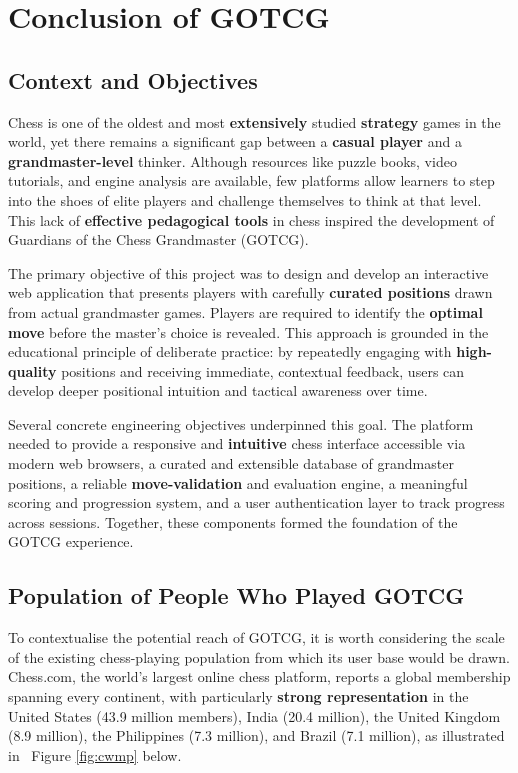 \chapter{Conclusion of GOTCG}
\label{cha:conclusion}

\section{Context and Objectives}

Chess is one of the oldest and most \textbf{extensively} studied \textbf{strategy} games in the world, yet there remains a significant gap between a \textbf{casual player} and a \textbf{grandmaster-level} thinker. Although resources like puzzle books, video tutorials, and engine analysis are available, few platforms allow learners to step into the shoes of elite players and challenge themselves to think at that level. This lack of \textbf{effective pedagogical tools} in chess inspired the development of Guardians of the Chess Grandmaster (GOTCG).

The primary objective of this project was to design and develop an interactive web application that presents players with carefully \textbf{curated positions} drawn from actual grandmaster games. Players are required to identify the \textbf{optimal move} before the master’s choice is revealed. This approach is grounded in the educational principle of deliberate practice: by repeatedly engaging with \textbf{high-quality} positions and receiving immediate, contextual feedback, users can develop deeper positional intuition and tactical awareness over time.

Several concrete engineering objectives underpinned this goal. The platform needed to provide a responsive and \textbf{intuitive} chess interface accessible via modern web browsers, a curated and extensible database of grandmaster positions, a reliable \textbf{move-validation} and evaluation engine, a meaningful scoring and progression system, and a user authentication layer to track progress across sessions. Together, these components formed the foundation of the GOTCG experience.

\section{Population of People Who Played GOTCG}
To contextualise the potential reach of GOTCG, it is worth considering the scale of the existing chess-playing population from which its user base would be drawn. Chess.com, the world's largest online chess platform, reports a global membership spanning every continent, with particularly \textbf{strong representation} in the United States (43.9 million members), India (20.4 million), the United Kingdom (8.9 million), the Philippines (7.3 million), and Brazil (7.1 million), as illustrated in ~Figure \ref{fig:cwmp} below.

